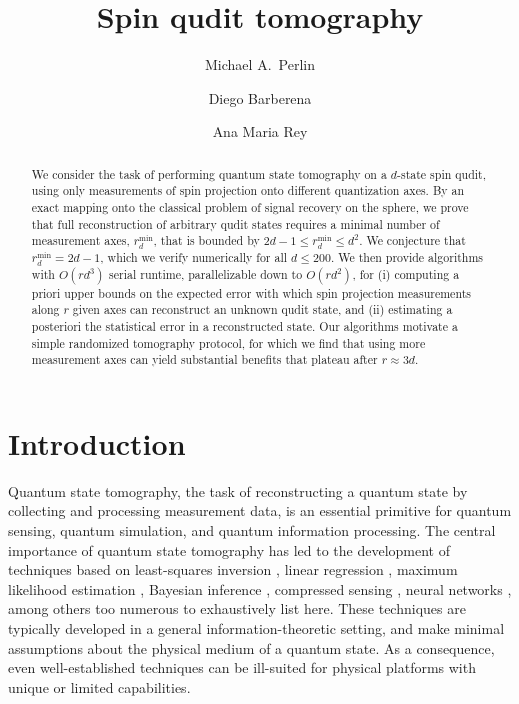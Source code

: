 \documentclass[a4paper,twocolumn,unpublished]{quantumarticle}
\renewcommand{\t}{\text} %
\newcommand{\p}[1]{\left(#1\right)} %
\begin{document}
\title{Spin qudit tomography}
\author[]{Michael A.~Perlin}
\author[]{Diego Barberena}
\author[]{Ana Maria Rey}


\begin{abstract}
  We consider the task of performing quantum state tomography on a $d$-state spin qudit, using only measurements of spin projection onto different quantization axes.
  By an exact mapping onto the classical problem of signal recovery on the sphere, we prove that full reconstruction of arbitrary qudit states requires a minimal number of measurement axes, $r_d^{\t{min}}$, that is bounded by $2d-1\le r_d^{\t{min}}\le d^2$.
  We conjecture that $r_d^{\t{min}}=2d-1$, which we verify numerically for all $d\le200$.
  We then provide algorithms with $O\p{rd^3}$ serial runtime, parallelizable down to $O\p{rd^2}$, for (i) computing a priori upper bounds on the expected error with which spin projection measurements along $r$ given axes can reconstruct an unknown qudit state, and (ii) estimating a posteriori the statistical error in a reconstructed state.
  Our algorithms motivate a simple randomized tomography protocol, for which we find that using more measurement axes can yield substantial benefits that plateau after $r\approx3d$.
\end{abstract}

\maketitle

\section{Introduction}

Quantum state tomography, the task of reconstructing a quantum state by collecting and processing measurement data, is an essential primitive for quantum sensing, quantum simulation, and quantum information processing.
The central importance of quantum state tomography has led to the development of techniques based on least-squares inversion \cite{opatrny1997leastsquares}, linear regression \cite{qi2013quantum}, maximum likelihood estimation \cite{teo2011quantumstate, smolin2012efficient}, Bayesian inference \cite{huszar2012adaptive, ferrie2014quantum, granade2016practical}, compressed sensing \cite{gross2010quantum, kalev2015quantum}, neural networks \cite{torlai2018neuralnetwork}, among others too numerous to exhaustively list here.
These techniques are typically developed in a general information-theoretic setting, and make minimal assumptions about the physical medium of a quantum state.
As a consequence, even well-established techniques can be ill-suited for physical platforms with unique or limited capabilities.
\end{document}
